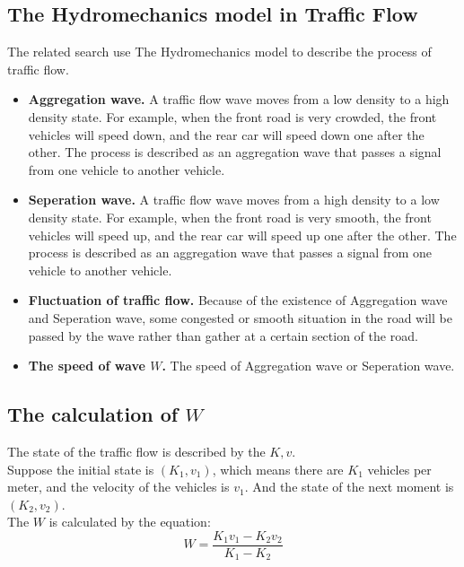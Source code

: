 \documentclass[UTF8]{mcmthesis}
\begin{document}
\subsection{The Hydromechanics model in Traffic Flow}
The related search use The Hydromechanics model to describe the process of traffic flow.
\begin{itemize}
\item{\textbf{Aggregation wave.} A traffic flow wave moves from a low density to a high density state. For example, when the front road is very crowded, the front vehicles will speed down, and the rear car will speed down one after the other. The process is described as an aggregation wave that passes a signal from one vehicle to another vehicle.}
\end{itemize}
\begin{itemize}
\item{\textbf{Seperation wave.} A traffic flow wave moves from a high density to a low density state. For example, when the front road is very smooth, the front vehicles will speed up, and the rear car will speed up one after the other. The process is described as an aggregation wave that passes a signal from one vehicle to another vehicle.}
\end{itemize}
\begin{itemize}
\item{\textbf{Fluctuation of traffic flow.} Because of the existence of Aggregation wave and Seperation wave, some congested or smooth situation in the road will be passed by the wave rather than gather at a certain section of the road.}
\end{itemize}
\begin{itemize}
\item{\textbf{The speed of wave $W$.} The speed of Aggregation wave or Seperation wave.}
\end{itemize}
\subsection{The calculation of $W$}
\indent The state of the traffic flow is described by the $K,v$.\\
\indent Suppose the initial state is $(K_{1}, v_{1})$, which means there are $K_{1}$ vehicles per meter, and the velocity of the vehicles is $v_{1}$. And the state of the next moment is $(K_{2}, v_{2})$. \\
\indent The $W$ is calculated by the equation:
\begin{equation}
	W=\frac{K_{1}v_{1}-K_{2}v_{2}}{K_{1}-K_{2}}
\end{equation}
\end{document}
